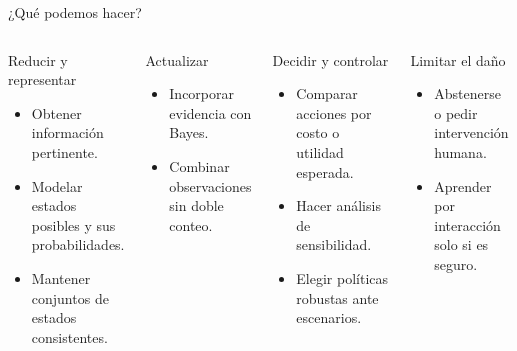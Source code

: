 \documentclass[aspectratio=169,10pt]{beamer}
\begin{document}
\begin{frame}{¿Qué podemos hacer?}
  \small
  \begin{columns}[T]
      \begin{block}{Reducir y representar}
        \begin{itemize}
          \item Obtener información pertinente.
          \item Modelar estados posibles y sus probabilidades.
          \item Mantener conjuntos de estados consistentes.
        \end{itemize}
      \end{block}
      \begin{block}{Actualizar}
        \begin{itemize}
          \item Incorporar evidencia con Bayes.
          \item Combinar observaciones sin doble conteo.
        \end{itemize}
      \end{block}
      \begin{block}{Decidir y controlar}
        \begin{itemize}
          \item Comparar acciones por costo o utilidad esperada.
          \item Hacer análisis de sensibilidad.
          \item Elegir políticas robustas ante escenarios.
        \end{itemize}
      \end{block}
      \begin{block}{Limitar el daño}
        \begin{itemize}
          \item Abstenerse o pedir intervención humana.
          \item Aprender por interacción solo si es seguro.
        \end{itemize}
      \end{block}
  \end{columns}
\end{frame}
\end{document}
